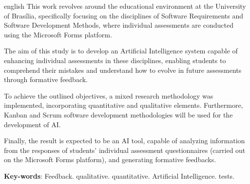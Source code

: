 \begin{resumo}[Abstract]
 \begin{otherlanguage*}{english}
   This work revolves around the educational environment at the University of Brasília, specifically focusing on the disciplines of Software Requirements and Software Development Methods, where individual assessments are conducted using the Microsoft Forms platform.

    The aim of this study is to develop an Artificial Intelligence system capable of enhancing individual assessments in these disciplines, enabling students to comprehend their mistakes and understand how to evolve in future assessments through formative feedback.

    To achieve the outlined objectives, a mixed research methodology was implemented, incorporating quantitative and qualitative elements. Furthermore, Kanban and Scrum software development methodologies will be used for the development of AI.

    Finally, the result is expected to be an AI tool, capable of analyzing information from the responses of students' individual assessment questionnaires (carried out on the Microsoft Forms platform), and generating formative feedbacks.
   \vspace{\onelineskip}
 
   \noindent 
   \textbf{Key-words}: Feedback. qualitative. quantitative. Artificial Intelligence. tests. 
 \end{otherlanguage*}
\end{resumo}
